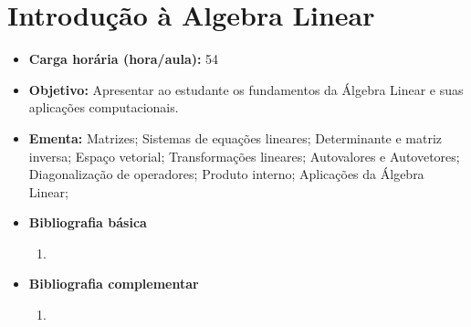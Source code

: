 \documentclass[11pt,fleqn]{book} %
\begin{document}
\section{Introdução à Algebra Linear}\label{2_algebra}
\begin{itemize}
	\item \textbf{Carga horária (hora/aula):} 54
	\item \textbf{Objetivo:} Apresentar ao estudante os fundamentos da Álgebra Linear e suas aplicações computacionais.
	\item \textbf{Ementa:} 
	Matrizes; 
	Sistemas de equações lineares; 
	Determinante e matriz inversa; 
	Espaço vetorial; 
	Transformações lineares; 
	Autovalores e Autovetores; 
	Diagonalização de operadores; 
	Produto interno;
	Aplicações da Álgebra Linear;
	\item \textbf{Bibliografia básica}
	\begin{enumerate}
		\item 
	\end{enumerate}
	\item \textbf{Bibliografia complementar}
	\begin{enumerate}
		\item 	
	\end{enumerate}	
\end{itemize}





\newpage
\end{document}
